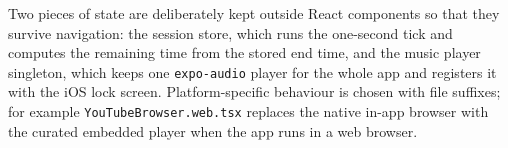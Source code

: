 Two pieces of state are deliberately kept outside React components so that
they survive navigation: the session store, which runs the one-second tick and
computes the remaining time from the stored end time, and the music player
singleton, which keeps one \texttt{expo-audio} player for the whole app and
registers it with the iOS lock screen. Platform-specific behaviour is chosen
with file suffixes; for example \texttt{YouTubeBrowser.web.tsx} replaces the
native in-app browser with the curated embedded player when the app runs in a
web browser.
